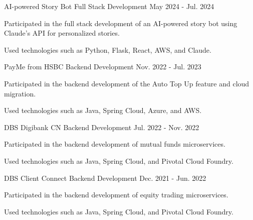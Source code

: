 

\begin{cventries}

  \cventry
    {AI-powered Story Bot} %
    {Full Stack Development} %
    {} %
    {May 2024 - Jul. 2024} %
    {
      \begin{cvitems} %
        \item {Participated in the full stack development of an AI-powered story bot using Claude’s API for personalized stories.}
        \item {Used technologies such as Python, Flask, React, AWS, and Claude.}
      \end{cvitems}
    }

  \cventry
    {PayMe from HSBC} %
    {Backend Development} %
    {} %
    {Nov. 2022 - Jul. 2023} %
    {
      \begin{cvitems} %
        \item {Participated in the backend development of the Auto Top Up feature and cloud migration.}
        \item {Used technologies such as Java, Spring Cloud, Azure, and AWS.}
      \end{cvitems}
    }

  \cventry
    {DBS Digibank CN} %
    {Backend Development} %
    {} %
    {Jul. 2022 - Nov. 2022} %
    {
      \begin{cvitems} %
        \item {Participated in the backend development of mutual funds microservices.}
        \item {Used technologies such as Java, Spring Cloud, and Pivotal Cloud Foundry.}
      \end{cvitems}
    }

  \cventry
    {DBS Client Connect} %
    {Backend Development} %
    {} %
    {Dec. 2021 - Jun. 2022} %
    {
      \begin{cvitems} %
        \item {Participated in the backend development of equity trading microservices.}
        \item {Used technologies such as Java, Spring Cloud, and Pivotal Cloud Foundry.}
      \end{cvitems}
    }


\end{cventries}
